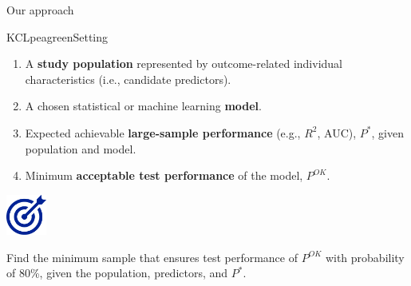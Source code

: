 \documentclass[11pt]{beamer}
\newcommand{\sgap}{\vspace{0.5em}}
\begin{document}
\begin{frame}[t]{Our approach}
    \vspace{0.5em}
    \begin{cbox}[bottom=4mm]{KCLpeagreen}{Setting}
		\begin{enumerate}
			\setlength{\itemsep}{7pt}
            \item A \textbf{study population} represented by outcome-related individual
			      characteristics (i.e., candidate predictors).
              \item A chosen statistical or machine learning \textbf{model}.
              \item Expected achievable \textbf{large-sample performance} (e.g., $R^2$, AUC), $P^{*}$, given population and model.
              \item Minimum \textbf{acceptable test performance} of the model, $P^{OK}$.
		\end{enumerate}
	\end{cbox}

	\sgap
	\centering
	\includegraphics[height=3.6em]{figures/target.pdf}
	\hspace{0.7em}
	\large
	\parbox[b]{0.8\textwidth}{ \raggedright \textcolor{KCLpantone}{ Find the
	    minimum sample that ensures test performance of $P^{OK}$ with
	    probability of 80\%, given the population, predictors, and $P^{*}$. }
	    }


\end{frame}
\end{document}
